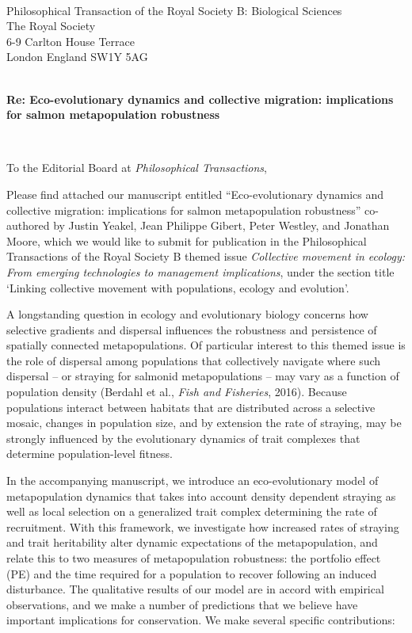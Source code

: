 \documentclass[ucm,12pt]{ucletter}
\begin{document}
\begin{letter}{
    \\ Philosophical Transaction of the Royal Society B: Biological Sciences\\
    The Royal Society\\
    6-9 Carlton House Terrace\\
    London England SW1Y 5AG\\ \\
    \vspace{1mm}
    \centerline{\bf{Re: Eco-evolutionary dynamics and collective migration: implications for salmon metapopulation robustness}} \\
}


\opening{To the Editorial Board at \emph{Philosophical Transactions},}



Please find attached our manuscript entitled ``Eco-evolutionary dynamics and collective migration: implications for salmon metapopulation robustness'' co-authored by Justin Yeakel, Jean Philippe Gibert, Peter Westley, and Jonathan Moore, which we would like to submit for publication in the Philosophical Transactions of the Royal Society B themed issue \emph{Collective movement in ecology: From emerging technologies to management implications}, under the section title `Linking collective movement with populations, ecology and evolution'.


A longstanding question in ecology and evolutionary biology concerns how selective gradients and dispersal influences the robustness and persistence of spatially connected metapopulations.
Of particular interest to this themed issue is the role of dispersal among populations that collectively navigate where such dispersal -- or straying for salmonid metapopulations -- may vary as a function of population density (Berdahl et al., \emph{Fish and Fisheries}, 2016).
Because populations interact between habitats that are distributed across a selective mosaic, changes in population size, and by extension the rate of straying, may be strongly influenced by the evolutionary dynamics of trait complexes that determine population-level fitness.

In the accompanying manuscript, we introduce an eco-evolutionary model of metapopulation dynamics that takes into account density dependent straying as well as local selection on a generalized trait complex determining the rate of recruitment.
With this framework, we investigate how increased rates of straying and trait heritability alter dynamic expectations of the metapopulation, and relate this to two measures of metapopulation robustness: the portfolio effect (PE) and the time required for a population to recover following an induced disturbance.
The qualitative results of our model are in accord with empirical observations, and we make a number of predictions that we believe have important implications for conservation.
We make several specific contributions:



\end{letter}
\end{document}

